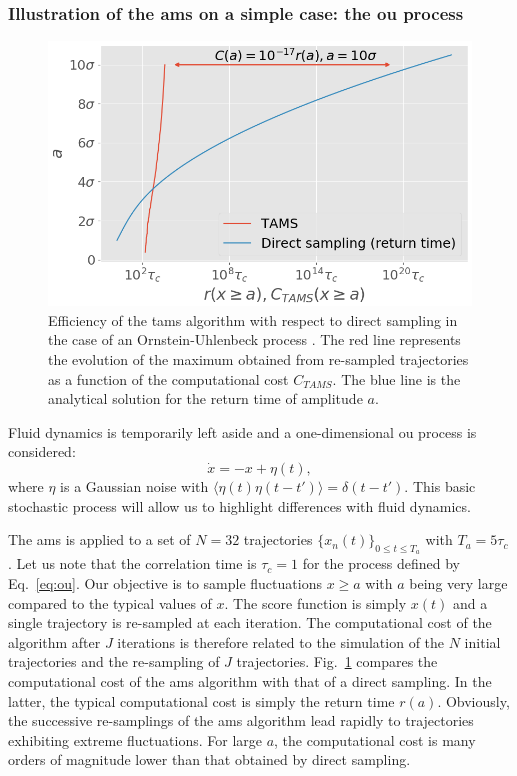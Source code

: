 \documentclass[pre,aps,floatfix,10pt,superscriptaddress, notitlepage,preprint]{revtex4-1}
\begin{document}
\subsubsection{Illustration of the \ac{ams} on a simple case: the \acl{ou} process}
\label{sec:ams_ou}
\begin{figure}
  \centering
  \includegraphics[width=.7\linewidth]{AMS_OU/AMS_OU.png}
    \caption{Efficiency of the \ac{tams} algorithm with respect to direct sampling in the case of an Ornstein-Uhlenbeck process \cite{lestang_computing_2018}. The red line represents the evolution of the maximum obtained from re-sampled trajectories as a function of the computational cost $C_{TAMS}$. The blue line is the analytical solution for the return time of amplitude $a$.}
  \label{fig:comparaison_temps_de_retour}
\end{figure}
Fluid dynamics is temporarily left aside and a one-dimensional \acl{ou} process is considered:
\begin{equation}
  \label{eq:ou}
  \dot{x} = -x + \eta (t),
\end{equation}
where $\eta$ is a Gaussian noise with $\langle \eta(t)\eta(t-t')\rangle = \delta(t-t')$.
This basic stochastic process will allow us to highlight differences with fluid dynamics.


The \ac{ams} is applied  to a set of $N=32$ trajectories $\{x_n(t)\}_{0\leq t \leq T_a}$ with $T_a=5\tau_c$.
Let us note that the correlation time is $\tau_c = 1$ for the process defined by Eq.~\eqref{eq:ou}.
Our objective is to sample fluctuations $x\geq a$ with $a$ being very large compared to the typical values of $x$.
The score function is simply $x(t)$ and a single trajectory is re-sampled at each iteration.
%
%
The computational cost of the algorithm after $J$ iterations is therefore related to the simulation of the $N$ initial trajectories and the re-sampling of $J$ trajectories.
Fig.~\ref{fig:comparaison_temps_de_retour} compares the computational cost of the \ac{ams} algorithm with that of a direct sampling. 
In the latter, the typical computational cost is simply the return time $r(a)$.
Obviously, the successive re-samplings of the \ac{ams} algorithm lead rapidly to trajectories exhibiting extreme fluctuations.
For large $a$, the computational cost is many orders of magnitude lower than that obtained by direct sampling.
\end{document}

